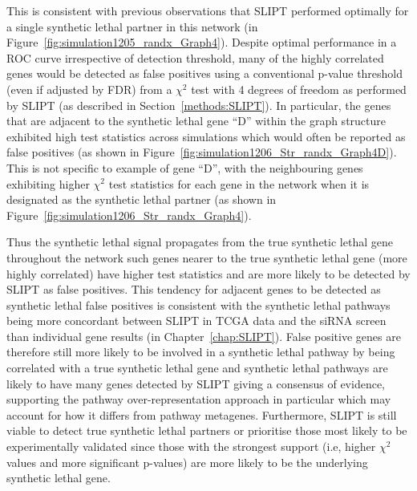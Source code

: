 This is consistent with previous observations that \gls{SLIPT} performed optimally for a single synthetic lethal partner in this network (in Figure~\ref{fig:simulation1205_randx_Graph4}). Despite optimal performance in a \gls{ROC} curve irrespective of detection threshold, many of the highly correlated genes would be detected as false positives using a conventional p-value threshold (even if adjusted by FDR) from a $\chi^2$ test with 4 degrees of freedom as performed by \gls{SLIPT} (as described in Section~\ref{methods:SLIPT}). In particular, the genes that are adjacent to the synthetic lethal gene ``D'' within the graph structure exhibited high test statistics across simulations which would often be reported as false positives (as shown in Figure~\ref{fig:simulation1206_Str_randx_Graph4D}). This is not specific to example of gene ``D'', with the neighbouring genes exhibiting higher $\chi^2$ test statistics for each gene in the network when it is designated as the synthetic lethal partner (as shown in Figure~\ref{fig:simulation1206_Str_randx_Graph4}).

Thus the synthetic lethal signal propagates from the true synthetic lethal gene throughout the network such genes nearer to the true synthetic lethal gene (more highly correlated) have higher test statistics and are more likely to be detected by \gls{SLIPT} as false positives. This tendency for adjacent genes to be detected as synthetic lethal false positives is consistent with the synthetic lethal pathways being more concordant between \gls{SLIPT} in TCGA data \citep{TCGA2012} and the \gls{siRNA} screen \citep{Telford2015} than individual gene results (in Chapter~\ref{chap:SLIPT}). False positive genes are therefore still more likely to be involved in a synthetic lethal pathway by being correlated with a true synthetic lethal gene and synthetic lethal pathways are likely to have many genes detected by \gls{SLIPT} giving a consensus of evidence, supporting the pathway over-representation approach in particular which may account for how it differs from pathway metagenes. Furthermore, \gls{SLIPT} is still viable to detect true synthetic lethal partners or prioritise those most likely to be experimentally validated since those with the strongest support (i.e, higher $\chi^2$ values and more significant p-values) are more likely to be the underlying synthetic lethal gene.

